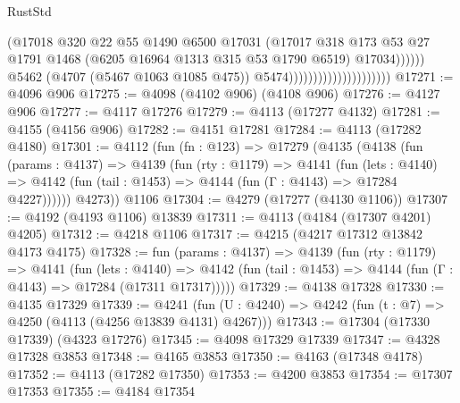 \begin{lexlean}{RustStd}
\begin{coremodule}
                                                      (@17018
                                                        @320
                                                        @22
                                                        @55
                                                        @1490
                                                        @6500
                                                        @17031
                                                        (@17017
                                                          @318
                                                          @173
                                                          @53
                                                          @27
                                                          @1791
                                                          @1468
                                                          (@6205 @16964 @1313 @315 @53 @1790 @6519)
                                                          @17034))))))
                                              @5462
                                              (@4707 (@5467 @1063 @1085 @475))
                                              @5474)))))))))))))))))))))
@17271 := @4096 @906
@17275 := @4098 (@4102 @906) (@4108 @906)
@17276 := @4127 @906
@17277 := @4117 @17276
@17279 := @4113 (@17277 @4132)
@17281 := @4155 (@4156 @906)
@17282 := @4151 @17281
@17284 := @4113 (@17282 @4180)
@17301 := @4112
    (fun (fn : @123) =>
    @17279
      (@4135
        (@4138
          (fun (params : @4137) =>
          @4139
            (fun (rty : @1179) =>
            @4141
              (fun (lets : @4140) =>
              @4142 (fun (tail : @1453) => @4144 (fun (Γ : @4143) => @17284 @4227))))))
        @4273))
    @1106
@17304 := @4279 (@17277 (@4130 @1106))
@17307 := @4192 (@4193 @1106) @13839
@17311 := @4113 (@4184 (@17307 @4201) @4205)
@17312 := @4218 @1106
@17317 := @4215 (@4217 @17312 @13842 @4173 @4175)
@17328 := fun (params : @4137) =>
  @4139
    (fun (rty : @1179) =>
    @4141
      (fun (lets : @4140) =>
      @4142 (fun (tail : @1453) => @4144 (fun (Γ : @4143) => @17284 (@17311 @17317)))))
@17329 := @4138 @17328
@17330 := @4135 @17329
@17339 := @4241
    (fun (U : @4240) => @4242 (fun (t : @7) => @4250 (@4113 (@4256 @13839 @4131) @4267)))
@17343 := @17304 (@17330 @17339) (@4323 @17276)
@17345 := @4098 @17329 @17339
@17347 := @4328 @17328 @3853
@17348 := @4165 @3853
@17350 := @4163 (@17348 @4178)
@17352 := @4113 (@17282 @17350)
@17353 := @4200 @3853
@17354 := @17307 @17353
@17355 := @4184 @17354

\end{coremodule}
\end{lexlean}
